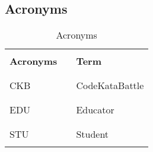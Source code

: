 \subsection{Acronyms}
\begin{table}[H]
    \centering
    \renewcommand{\arraystretch}{0.5}
    \begin{tabular}{l l p{11cm}}
        \hline
                          &        &                    \\
        \textbf{Acronyms} & \vline & \textbf{Term}      \\
                          &        &                    \\\hline & & \\
        CKB               & \vline & CodeKataBattle     \\
                          &        &                    \\\hline & & \\
        EDU               & \vline & Educator           \\
                          &        &                    \\\hline & & \\
        STU               & \vline & Student            \\
                          &        &                    \\
        \hline
    \end{tabular}
    \caption{Acronyms}
\end{table}

